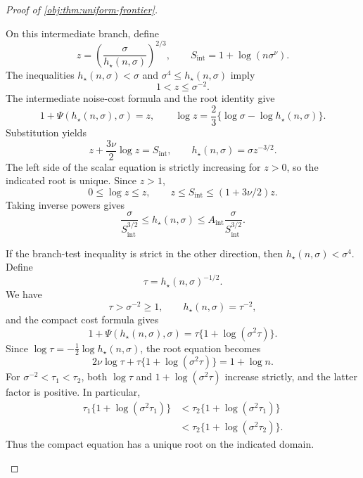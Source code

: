 \begin{proof}[Proof of \cref{obj:thm:uniform-frontier}]
\begin{enumerate}
On this intermediate branch, define
\[
z=\left(\frac{\sigma}{h_\star(n,\sigma)}\right)^{2/3},
\qquad
S_{\mathrm{int}}=1+\log(n\sigma^\nu).
\]
The inequalities \(h_\star(n,\sigma)<\sigma\) and
\(\sigma^4\le h_\star(n,\sigma)\) imply
\[
1<z\le\sigma^{-2}.
\]
The intermediate noise-cost formula and the root identity give
\[
1+\Psi(h_\star(n,\sigma),\sigma)=z,
\qquad
\log z=\frac23\{\log\sigma-\log h_\star(n,\sigma)\}.
\]
Substitution yields
\[
z+\frac{3\nu}{2}\log z=S_{\mathrm{int}},
\qquad
h_\star(n,\sigma)=\sigma z^{-3/2}.
\]
The left side of the scalar equation is strictly increasing for \(z>0\),
so the indicated root is unique. Since \(z>1\),
\[
0\le\log z\le z,
\qquad
z\le S_{\mathrm{int}}\le(1+3\nu/2)z.
\]
Taking inverse powers gives
\[
\frac{\sigma}{S_{\mathrm{int}}^{3/2}}
\le h_\star(n,\sigma)
\le A_{\mathrm{int}}\frac{\sigma}{S_{\mathrm{int}}^{3/2}}.
\]

If the branch-test inequality is strict in the other direction, then
\(h_\star(n,\sigma)<\sigma^4\). Define
\[
\tau=h_\star(n,\sigma)^{-1/2}.
\]
We have
\[
\tau>\sigma^{-2}\ge1,\qquad
h_\star(n,\sigma)=\tau^{-2},
\]
and the compact cost formula gives
\[
1+\Psi(h_\star(n,\sigma),\sigma)
=\tau\{1+\log(\sigma^2\tau)\}.
\]
Since \(\log\tau=-\tfrac12\log h_\star(n,\sigma)\), the root equation becomes
\[
2\nu\log\tau+\tau\{1+\log(\sigma^2\tau)\}
=1+\log n.
\]
For \(\sigma^{-2}<\tau_1<\tau_2\), both
\(\log\tau\) and \(1+\log(\sigma^2\tau)\) increase strictly, and the latter
factor is positive. In particular,
\[
\begin{aligned}
\tau_1\{1+\log(\sigma^2\tau_1)\}
&<\tau_2\{1+\log(\sigma^2\tau_1)\}\\
&<\tau_2\{1+\log(\sigma^2\tau_2)\}.
\end{aligned}
\]
Thus the compact equation has a unique root on the indicated domain.


\end{enumerate}
\end{proof}
